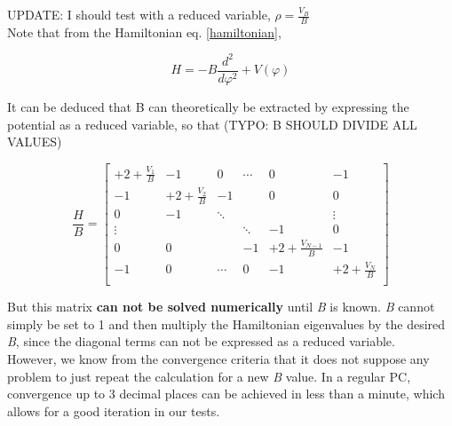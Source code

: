 \documentclass[12pt,a4paper]{article}
\begin{document}
UPDATE: I should test with a reduced variable, $\rho=\frac{V_B}{B}$\\

Note that from the Hamiltonian eq. \eqref{hamiltonian},

\begin{equation*}
    H = -B \frac{d^2}{d\varphi^2} + V(\varphi)
\end{equation*}

It can be deduced that B can theoretically be extracted by expressing the potential as a reduced variable, so that (TYPO: B SHOULD DIVIDE ALL VALUES)

\[
    \frac{H}{B} =
    \left[ {\begin{array}{cccccc}
     +2 +\frac{V_1}{B}  &  -1                &  0     & \cdots &  0                     &  -1                \\
     -1                 & +2 +\frac{V_2}{B}  &  -1    &        &  0                     &  0                 \\
     0                  &  -1                & \ddots &        &                        &  \vdots            \\
     \vdots             &                    &        & \ddots &  -1                    &  0                 \\
     0                  &  0                 &        &  -1    & +2 +\frac{V_{N-1}}{B}  &  -1                \\
     -1                 &  0                 & \cdots &  0     &  -1                    & +2 +\frac{V_N}{B}  \\
    \end{array} } \right]
\]

But this matrix \textbf{can not be solved numerically} until \textit{B} is known.
\textit{B} cannot simply be set to 1 and then multiply the Hamiltonian eigenvalues by the desired \textit{B}, since the diagonal terms can not be expressed as a reduced variable.\\

However, we know from the convergence criteria that it does not suppose any problem to just repeat the calculation for a new \textit{B} value. In a regular PC, convergence up to 3 decimal places can be achieved in less than a minute, which allows for a good iteration in our tests.\\


\end{document}
